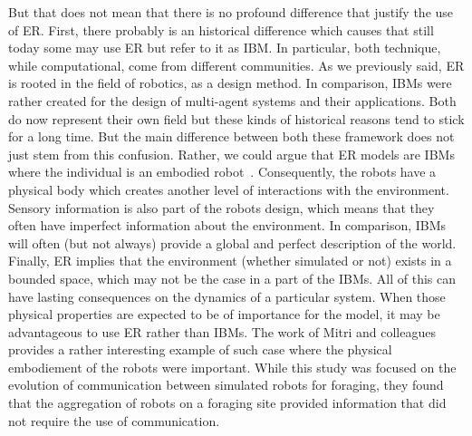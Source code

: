     But that does not mean that there is no profound difference that justify the use of ER. First, there probably is an historical difference which causes that still today some may use ER but refer to it as IBM. In particular, both technique, while computational, come from different communities. As we previously said, ER is rooted in the field of robotics, as a design method. In comparison, IBMs were rather created for the design of multi-agent systems and their applications. Both do now represent their own field but these kinds of historical reasons tend to stick for a long time. But the main difference between both these framework does not just stem from this confusion. Rather, we could argue that ER models are IBMs where the individual is an embodied robot~\cite{Mitri2012}. Consequently, the robots have a physical body which creates another level of interactions with the environment. Sensory information is also part of the robots design, which means that they often have imperfect information about the environment. In comparison, IBMs will often (but not always) provide a global and perfect description of the world. Finally, ER implies that the environment (whether simulated or not) exists in a bounded space, which may not be the case in a part of the IBMs. All of this can have lasting consequences on the dynamics of a particular system. When those physical properties are expected to be of importance for the model, it may be advantageous to use ER rather than IBMs. The work of Mitri and colleagues~\cite{Mitri2009} provides a rather interesting example of such case where the physical embodiement of the robots were important. While this study was focused on the evolution of communication between simulated robots for foraging, they found that the aggregation of robots on a foraging site provided information that did not require the use of communication.

